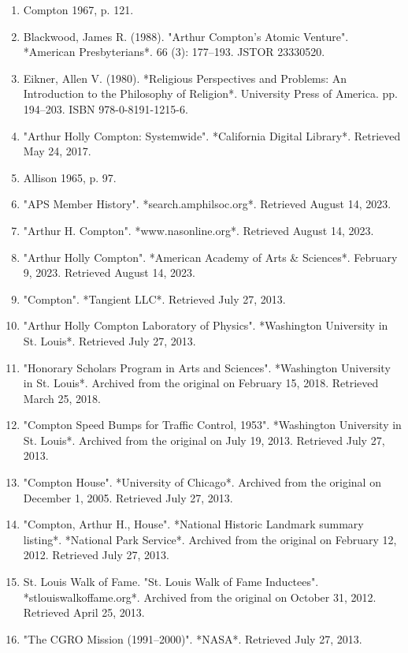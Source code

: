 \begin{enumerate}
\item Compton 1967, p. 121.
\item Blackwood, James R. (1988). "Arthur Compton's Atomic Venture". *American Presbyterians*. 66 (3): 177–193. JSTOR 23330520.
\item Eikner, Allen V. (1980). *Religious Perspectives and Problems: An Introduction to the Philosophy of Religion*. University Press of America. pp. 194–203. ISBN 978-0-8191-1215-6.
\item "Arthur Holly Compton: Systemwide". *California Digital Library*. Retrieved May 24, 2017.
\item Allison 1965, p. 97.
\item "APS Member History". *search.amphilsoc.org*. Retrieved August 14, 2023.
\item "Arthur H. Compton". *www.nasonline.org*. Retrieved August 14, 2023.
\item "Arthur Holly Compton". *American Academy of Arts & Sciences*. February 9, 2023. Retrieved August 14, 2023.
\item "Compton". *Tangient LLC*. Retrieved July 27, 2013.
\item  "Arthur Holly Compton Laboratory of Physics". *Washington University in St. Louis*. Retrieved July 27, 2013.
\item  "Honorary Scholars Program in Arts and Sciences". *Washington University in St. Louis*. Archived from the original on February 15, 2018. Retrieved March 25, 2018.
\item "Compton Speed Bumps for Traffic Control, 1953". *Washington University in St. Louis*. Archived from the original on July 19, 2013. Retrieved July 27, 2013.
\item "Compton House". *University of Chicago*. Archived from the original on December 1, 2005. Retrieved July 27, 2013.
\item "Compton, Arthur H., House". *National Historic Landmark summary listing*. *National Park Service*. Archived from the original on February 12, 2012. Retrieved July 27, 2013.
\item St. Louis Walk of Fame. "St. Louis Walk of Fame Inductees". *stlouiswalkoffame.org*. Archived from the original on October 31, 2012. Retrieved April 25, 2013.
\item "The CGRO Mission (1991–2000)". *NASA*. Retrieved July 27, 2013.
\end{enumerate}
